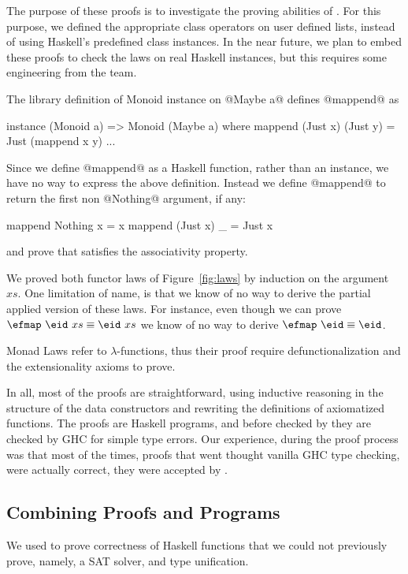 The purpose of these proofs is to investigate the proving abilities of \libname.
For this purpose, we defined the appropriate class operators on user defined lists,
instead of using Haskell's predefined class instances.
%
In the near future, we plan to embed these proofs
to check the laws on real Haskell instances,
but this requires some engineering from the \liquidHaskell team.


The library definition of Monoid instance on @Maybe a@
defines @mappend@ as
\begin{code}
  instance (Monoid a)
           => Monoid (Maybe a) where
    mappend (Just x) (Just y)
      = Just (mappend x y)
    ...
\end{code}
%
Since we define @mappend@ as a Haskell function,
rather than an instance,
we have no way to express the above definition.
Instead we define @mappend@ to return the first non @Nothing@
argument, if any:
\begin{code}
  mappend Nothing x  = x
  mappend (Just x) _ = Just x
\end{code}
and prove that satisfies the associativity property.

%
We proved both functor laws of Figure~\ref{fig:laws}
by induction on the argument $xs$.
%
One limitation of \libname name, is that
we know of no way to derive the partial
applied version of these laws.
%
For instance, even though we can prove
$\efmap\ \eid\ xs \equiv \eid\ xs$
we know of no way to derive
$\efmap\ \eid \equiv \eid$.

Monad Laws refer to $\lambda$-functions,
thus their proof require defunctionalization and
the extensionality axioms to prove.

In all,
most of the proofs are straightforward,
using inductive reasoning in the structure of the data constructors
and rewriting the definitions of axiomatized functions.
%
The proofs are Haskell programs, and before checked by \liquidHaskell
they are checked by GHC for simple type errors.
%
Our experience,
during the proof process was that most of the times,
proofs that went thought vanilla GHC type checking,
were actually correct, \ie they were accepted by \liquidHaskell.

\subsection{Combining Proofs and Programs} \label{subsec:programs}
%
We used \libname to prove correctness of Haskell functions
that we could not previously prove,
namely, a SAT solver, and type unification.

